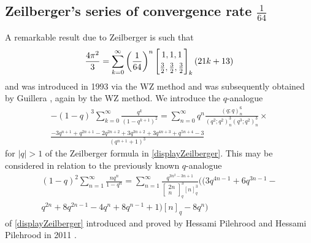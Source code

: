 \documentclass[12pt]{article}
\begin{document}
\subsection{Zeilberger's series of convergence rate $\frac{1}{64}$}\label{sectionZeilberger}
 A remarkable result due to Zeilberger is such that 
\begin{equation}\label{displayZeilberger}
 \frac{4\pi^2}{3} = 
 \sum_{k = 0}^{\infty} 
 \left( \frac{1}{64} \right)^{n} \left[ \begin{matrix} 
 1, 1, 1 
 \vspace{1mm} \\ 
 \frac{3}{2}, \frac{3}{2}, \frac{3}{2} 
 \end{matrix} \right]_{k} (21k + 13) 
 \end{equation}
 and was introduced in 1993 \cite{Zeilberger1993} via the WZ method and was subsequently obtained by Guillera \cite{Guillera2008}, 
 again by the WZ method. We introduce the $q$-analogue 
\begin{multline*}
 -(1-q)^3 \sum_{k=0}^{\infty} \frac{q^{k}}{(1-q^{k+1})^2} = \sum_{n=0}^{\infty} q^{n} 
 \frac{ \left( q;q \right)_{n}^{6} }{ \left( q^{2};q^{2} \right)_{n}^{3} 
 \left( q^{3};q^{2} \right)_{n}^{3} } \times \\ 
 \frac{-3 q^{n+1}+q^{2 n+1}-2 q^{2 n+2}+3 q^{3 n+2}+3 q^{4 n+3}+q^{5 n+4}-3}{\left(q^{n+1}+1\right)^3} 
\end{multline*}
 for $|q| > 1$ of the Zeilberger formula in \eqref{displayZeilberger}. This may be considered in relation to the previously
 known $q$-analogue 
\begin{multline*}
 (1-q)^{2} \sum_{n=1}^{\infty} \frac{ n q^{n} }{1-q^{n}} = \sum_{n=1}^{\infty} \frac{q^{3n^2-3n+1}}{ \left[ \begin{smallmatrix} 
 2 n \\ 
 n 
 \end{smallmatrix} \right]_{q}^{3} [n]_{q}^{3} } 
 \big( (3q^{4n-1} + 6 q^{3n-1} - \\ q^{2n} + 8 q^{2n-1} - 4 q^{n} + 8 q^{n-1} + 1) [n]_{q} - 8 q^{n} \big) 
\end{multline*}
 of \eqref{displayZeilberger} introduced and proved by 
 Hessami Pilehrood and Hessami Pilehrood in 2011 \cite{HessamiPilehroodHessamiPilehrood2011}. 
\end{document}
